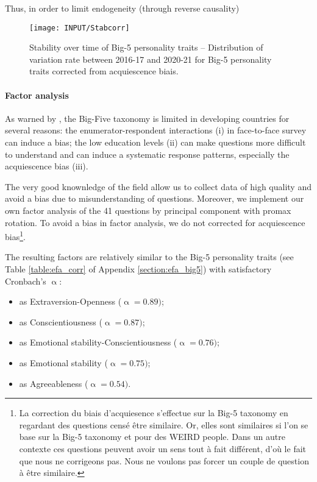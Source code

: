 \documentclass[a4paper, 11pt, onecolumn]{article}
\begin{document}
Thus, in order to limit endogeneity (through reverse causality)  

\begin{figure}[htpb]
\raggedright
\texttt{[image: INPUT/Stabcorr]}
\caption{Stability over time of Big-5 personality traits -- Distribution of variation rate between 2016-17 and 2020-21 for Big-5 personality traits corrected from acquiescence biais.}
\label{fig:stab}
\end{figure}



\paragraph{Factor analysis}
As warned by \cite{Laajaj2019}, the Big-Five taxonomy is limited in developing countries for several reasons: the enumerator-respondent interactions (i) in face-to-face survey can induce a bias; the low education levels (ii) can make questions more difficult to understand and can induce a systematic response patterns, especially the acquiescence bias (iii).

The very good knownledge of the field allow us to collect data of high quality and avoid a bias due to misunderstanding of questions.
Moreover, we implement our own factor analysis of the 41 questions by principal component with promax rotation.
To avoid a bias in factor analysis, we do not corrected for acquiescence bias\footnote{La correction du biais d'acquiesence s'effectue sur la Big-5 taxonomy en regardant des questions censé être similaire. Or, elles sont similaires si l'on se base sur la Big-5 taxonomy et pour des WEIRD people. Dans un autre contexte ces questions peuvent avoir un sens tout à fait différent, d'où le fait que nous ne corrigeons pas. Nous ne voulons pas forcer un couple de question à être similaire.}.

The resulting factors are relatively similar to the Big-5 personality traits (see Table \ref{table:efa_corr} of Appendix \ref{section:efa_big5}) with satisfactory Cronbach's $\upalpha$:
\begin{itemize}
\item[Factor 1] as Extraversion-Openness ($\upalpha=0.89)$;
\item[Factor 2] as Conscientiousness ($\upalpha=0.87)$;
\item[Factor 3] as Emotional stability-Conscientiousness ($\upalpha=0.76)$;
\item[Factor 4] as Emotional stability ($\upalpha=0.75)$;
\item[Factor 5] as Agreeableness ($\upalpha=0.54)$.
\end{itemize}
\end{document}

